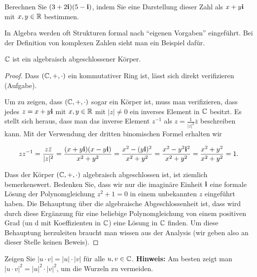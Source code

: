 \begin{aufg}
	Berechnen Sie $(3+ 2 \mathbf{i}) ( 5 - \mathbf{i})$, indem Sie eine Darstellung dieser Zahl als $x+y \mathbf{i}$ mit $x, y \in \mathbb{R}$ bestimmen. 
\end{aufg} 

\begin{bem}
	In Algebra werden oft Strukturen formal nach ``eigenen Vorgaben'' eingeführt. Bei der Definition von komplexen Zahlen sieht man ein Beispiel dafür. 
\end{bem} 

\begin{thm}
		$\mathbb{C}$ ist ein algebraisch abgeschlossener Körper. 
\end{thm}
\begin{proof} 
	Dass $(\mathbb{C},+,\cdot)$ ein kommutativer Ring ist, lässt sich direkt verifizieren (Aufgabe). 
	
	Um zu zeigen, dass $(\mathbb{C},+,\cdot)$ sogar ein Körper ist, muss man verifizieren, dass jedes $z = x + y \mathbf{i}$ mit $x, y \in \mathbb{R}$ mit $|z| \ne 0$ ein inverses Element in $\mathbb{C}$ besitzt. Es stellt sich heraus, dass man das inverse Element $z^{-1}$ als $z = \frac{1}{|z|^2} \bar{z}$ beschreiben kann. Mit der Verwendung der dritten binomischen Formel erhalten wir 
	
	\[
		 	z z^{-1} = \frac{z \bar{z} }{|z|^2} = \frac{ ( x+ y \mathbf{i}) ( x - y\mathbf{i}) }{x^2 + y^2}   = \frac{ x^2 - (y \mathbf{i})^2 }{x^2 + y^2} = \frac{x^2 - y^2 \mathbf{i}^2}{x^2 + y^2} = \frac{x^2 + y^2}{x^2 + y^2} = 1. 
	\]
	
	Dass der Körper $(\mathbb{C},+,\cdot)$ algebraisch abgeschlossen ist, ist ziemlich bemerkenswert. Bedenken Sie, dass wir nur die imaginäre Einheit $\mathbf{i}$ eine formale Lösung der Polynomgleichung $z^2 + 1=0$ in einem unbekannten $z$ eingeführt haben. Die Behauptung über die algebraische Abgeschlossenheit ist, dass wird durch diese Ergänzung für eine beliebige Polynomgleichung von einem positiven Grad (un d mit Koeffizienten in $\mathbb{C}$) eine Lösung in $\mathbb{C}$ finden. Um diese Behauptung herzuleiten braucht man wissen aus der Analysis (wir geben also an dieser Stelle keinen Beweis). 
\end{proof} 

\begin{aufg}
	Zeigen Sie $|u \cdot v| = |u| \cdot |v|$ für alle $u, v \in \mathbb{C}$. \textbf{Hinweis:} Am besten zeigt man $|u \cdot v|^2 = |u|^2  \cdot |v|^2$, um die Wurzeln zu vermeiden. 
\end{aufg} 

